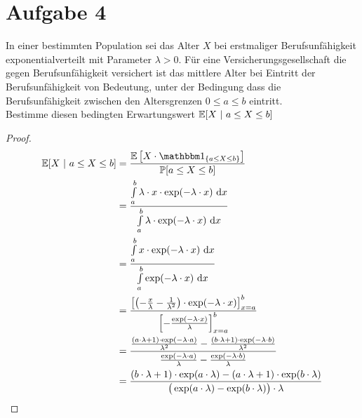 \documentclass[12pt,a4paper]{article}
\begin{document}
\section*{Aufgabe 4}
In einer bestimmten Population sei das Alter $X$ bei erstmaliger
Berufsunfähigkeit exponentialverteilt mit Parameter $\lambda>0$. Für eine Versicherungsgesellschaft die gegen Berufsunfähigkeit versichert ist das mittlere Alter bei Eintritt der Berufsunfähigkeit von Bedeutung, unter der Bedingung dass die Berufsunfähigkeit zwischen den Altersgrenzen $0\leq a\leq b$ eintritt.\\
Bestimme diesen bedingten Erwartungswert $\mathbb{E}[X~|~a\leq X\leq b]$
\begin{proof}
\begin{align*}
\E[X~|~a\leq X\leq b]
&=\frac{\E\left[X\cdot\indi_{\lbrace a\leq X\leq b\rbrace}\right]}{\P[a\leq X\leq b]}\\
&=\frac{\int\limits_a^b \lambda\cdot x\cdot\exp(-\lambda\cdot x)\d x}{\int\limits_a^b\lambda\cdot\exp(-\lambda\cdot x)\d x}\\
&=\frac{\int\limits_a^b x\cdot\exp(-\lambda\cdot x)\d x}{\int\limits_a^b\exp(-\lambda\cdot x)\d x}\\
&=\frac{\left[\left(-\frac{x}{\lambda}-\frac{1}{\lambda^2}\right)\cdot\exp(-\lambda\cdot x)\right]_{x=a}^b}
{\left[-\frac{\exp(-\lambda\cdot x)}{\lambda}\right]_{x=a}^b}\\
&=\frac{\frac{(a\cdot\lambda+1)\cdot\exp(-\lambda\cdot a)}{\lambda^2}-\frac{(b\cdot\lambda+1)\cdot\exp(-\lambda\cdot b)}{\lambda^2}}{\frac{\exp(-\lambda\cdot a)}{\lambda}-\frac{\exp(-\lambda\cdot b)}{\lambda}}\\
&=\frac{(b\cdot\lambda+1)\cdot\exp(a\cdot\lambda)-(a\cdot\lambda+1)\cdot\exp(b\cdot\lambda)}{\big(\exp(a\cdot\lambda)-\exp(b\cdot\lambda)\big)\cdot\lambda}
\end{align*}
\end{proof}
\end{document}
